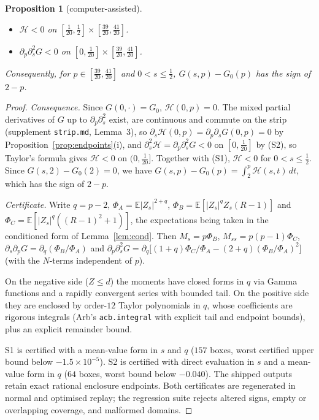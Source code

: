 \documentclass[11pt]{article}
\newtheorem{proposition}[theorem]{Proposition}
\theoremstyle{remark}
\newcommand{\E}{\mathbb E}
\begin{document}
\begin{proposition}[computer-assisted]\label{prop:strip}
\begin{itemize}
\item[(S1)] $\mathcal H<0$ on $[\frac1{20},\frac12]\times[\frac{39}{20},\frac{41}{20}]$.
\item[(S2)] $\partial_p\partial_s^2G<0$ on $[0,\frac1{20}]\times[\frac{39}{20},\frac{41}{20}]$.
\end{itemize}
Consequently, for $p\in[\frac{39}{20},\frac{41}{20}]$ and $0<s\le\frac12$, $G(s,p)-G_0(p)$ has the sign of $2-p$.
\end{proposition}
\begin{proof}
\emph{Consequence.} Since $G(0,\cdot)=G_0$, $\mathcal H(0,p)=0$. The mixed partial derivatives of $G$ up to $\partial_p\partial_s^2$ exist, are continuous and commute on the strip (supplement \texttt{strip.md}, Lemma~3), so $\partial_s\mathcal H(0,p)=\partial_p\partial_sG(0,p)=0$ by Proposition~\ref{prop:endpoints}(i), and $\partial_s^2\mathcal H=\partial_p\partial_s^2G<0$ on $[0,\frac1{20}]$ by (S2), so Taylor's formula gives $\mathcal H<0$ on $(0,\frac1{20}]$. Together with (S1), $\mathcal H<0$ for $0<s\le\frac12$. Since $G(s,2)-G_0(2)=0$, we have $G(s,p)-G_0(p)=\int_2^p\mathcal H(s,t)\,dt$, which has the sign of $2-p$.

\emph{Certificate.} Write $q=p-2$, $\Phi_A=\E|Z_s|^{2+q}$, $\Phi_B=\E[|Z_s|^qZ_s(R-1)]$ and $\Phi_C=\E[|Z_s|^q((R-1)^2+1)]$, the expectations being taken in the conditioned form of Lemma~\ref{lem:cond}. Then $M_s=p\Phi_B$, $M_{ss}=p(p-1)\Phi_C$, $\partial_s\partial_pG=\partial_q(\Phi_B/\Phi_A)$ and $\partial_p\partial_s^2G=\partial_q\bigl[(1+q)\Phi_C/\Phi_A-(2+q)(\Phi_B/\Phi_A)^2\bigr]$ (with the $N$-terms independent of $p$).

On the negative side ($Z\le d$) the moments have closed forms in $q$ via Gamma functions and a rapidly convergent series with bounded tail. On the positive side they are enclosed by order-$12$ Taylor polynomials in $q$, whose coefficients are rigorous integrals (Arb's \texttt{acb.integral} with explicit tail and endpoint bounds), plus an explicit remainder bound.

S1 is certified with a mean-value form in $s$ and $q$ ($157$ boxes, worst certified upper bound below $-1.5\times10^{-5}$). S2 is certified with direct evaluation in $s$ and a mean-value form in $q$ ($64$ boxes, worst bound below $-0.040$). The shipped outputs retain exact rational enclosure endpoints. Both certificates are regenerated in normal and optimised replay; the regression suite rejects altered signs, empty or overlapping coverage, and malformed domains.
\end{proof}
\end{document}
